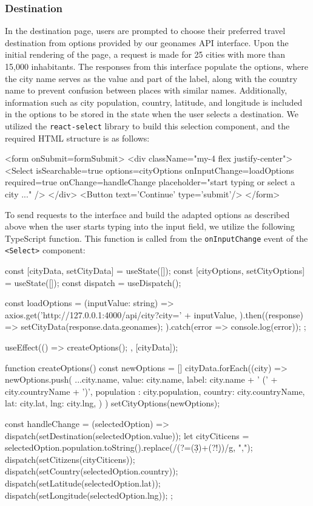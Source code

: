\documentclass[english,notitlepage,smartquotes]{hgbreport}
\begin{document}
\subsubsection{Destination}\label{DestinationPage}

In the destination page, users are prompted to choose their preferred travel destination from options provided by our geonames API interface. Upon the initial rendering of the page, a request is made for 25 cities with more than 15,000 inhabitants. The responses from this interface populate the options, where the city name serves as the value and part of the label, along with the country name to prevent confusion between places with similar names. Additionally, information such as city population, country, latitude, and longitude is included in the options to be stored in the state when the user selects a destination. We utilized the \texttt{react-select} library to build this selection component, and the required HTML structure is as follows:

\begin{HtmlCode}
	<form onSubmit={formSubmit}>
		<div className="my-4 flex justify-center">
			<Select
				isSearchable={true}
				options={cityOptions}
				onInputChange={loadOptions}
				required={true}
				onChange={handleChange}
				placeholder="start typing or select a city ..."
			/>
		</div>
		<Button text='Continue' type='submit'/>
	</form>
\end{HtmlCode}

To send requests to the interface and build the adapted options as described above when the user starts typing into the input field, we utilize the following TypeScript function. This function is called from the \texttt{onInputChange} event of the \texttt{<Select>} component:

\begin{JsCode}
const [cityData, setCityData] = useState([]);
const [cityOptions, setCityOptions] = useState([]);
const dispatch = useDispatch();
	
const loadOptions = (inputValue: string) => {
	axios.get('http://127.0.0.1:4000/api/city?city=' + inputValue, {}).then((response) => {
		setCityData(response.data.geonames);
	}).catch(error => console.log(error));
};

useEffect(() => {
	createOptions();
}, [cityData]);

function createOptions() {
	const newOptions = []
	cityData.forEach((city) => {
		newOptions.push({
			...city.name,
			value: city.name,
			label: city.name + ' (' + city.countryName + ')',
			population : city.population,
			country: city.countryName,
			lat: city.lat,
			lng: city.lng,
		})
	})
	setCityOptions(newOptions);
}

const handleChange = (selectedOption) => {
	dispatch(setDestination(selectedOption.value));
	let cityCiticens = selectedOption.population.toString().replace(/\B(?=(\d{3})+(?!\d))/g, ",");
	dispatch(setCitizens(cityCiticens));
	dispatch(setCountry(selectedOption.country));
	dispatch(setLatitude(selectedOption.lat));
	dispatch(setLongitude(selectedOption.lng));
};
\end{JsCode}
\end{document}
